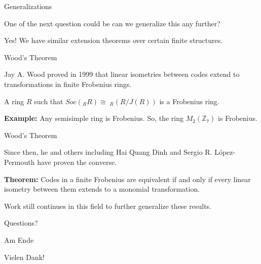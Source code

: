 \documentclass{beamer}
\begin{document}
\begin{frame}{Generalizations}
    
    One of the next question could be can we generalize this any further?

    \bigskip

    \pause

    Yes! We have similar extension theorems over certain finite structures.

\end{frame}

\begin{frame}{Wood's Theorem}
    
    Jay A. Wood proved in 1999 that linear isometries between codes extend to transformations in
    finite Frobenius rings.

    \bigskip

    A ring $R$ such that $Soc(_RR)\cong\;_R(R/J(R))$ is a Frobenius ring.

    \bigskip

    \pause

    \textbf{Example:} Any semisimple ring is Frobenius. So, the ring $M_2(\mathbb{Z}_7)$ is Frobenius.

\end{frame}

\begin{frame}{Wood's Theorem}
    
    Since then, he and others including Hai Quang Dinh and Sergio R. L\'{o}pez-Permouth have proven
    the converse.

    \bigskip

    \pause

    \textbf{Theorem:} Codes in a finite Frobenius are equivalent if and only if every linear isometry
    between them extends to a monomial transformation.

    \bigskip

    \pause

    Work still continues in this field to further generalize these results.

\end{frame}

\begin{frame}

    \begin{center}
        Questions?
    \end{center}

\end{frame}

\begin{frame}{Am Ende}

    \begin{center}
        Vielen Dank!
    \end{center}

\end{frame}
\end{document}
